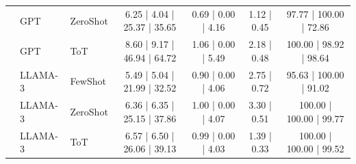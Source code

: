 \begin{table}[t]
{\begin{tabular}{lllcccc}
 & GPT & ZeroShot & 6.25 | 4.04 | 25.37 | 35.65 & 0.69 | 0.00 | 4.16 & 1.12 | 0.45 & 97.77 | 100.00 | 72.86 \\
 & GPT & ToT & 8.60 | 9.17 | 46.94 | 64.72 & 1.06 | 0.00 | 5.49 & 2.18 | 0.48 & 100.00 | 98.92 | 98.64 \\
 & LLAMA-3 & FewShot & 5.49 | 5.04 | 21.99 | 32.52 & 0.90 | 0.00 | 4.06 & 2.75 | 0.72 & 95.63 | 100.00 | 91.02 \\
 & LLAMA-3 & ZeroShot & 6.36 | 6.35 | 25.15 | 37.86 & 1.00 | 0.00 | 4.07 & 3.30 | 0.51 & 100.00 | 100.00 | 99.77 \\
 & LLAMA-3 & ToT & 6.57 | 6.50 | 26.06 | 39.13 & 0.99 | 0.00 | 4.03 & 1.39 | 0.33 & 100.00 | 100.00 | 99.52 \\
\bottomrule
\end{tabular}%
}
\end{table}
